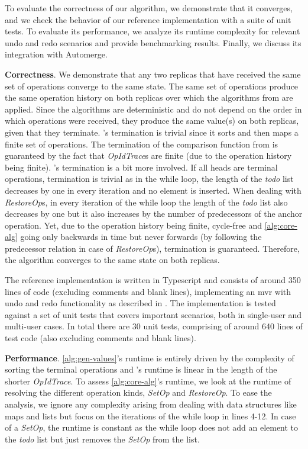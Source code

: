 \documentclass[sigplan,natbib=false,review]{acmart}
\newcommand{\setopkind}{\textit{SetOp}}
\newcommand{\restopkind}{\textit{RestoreOp}}
\newcommand{\opidtrace}{\textit{OpIdTrace}}
\begin{document}
To evaluate the correctness of our algorithm, we demonstrate that it converges,
and we check the behavior of our reference implementation with a suite of unit tests.
To evaluate its performance, we analyze its runtime complexity for relevant
undo and redo scenarios and provide benchmarking results.
Finally, we discuss its integration with Automerge.

\textbf{Correctness}.
We demonstrate that any two replicas that have received the same set of
operations converge to the same state.
The same set of operations produce the same operation history on both
replicas over which the algorithms from  are applied.
Since the algorithms are deterministic and do not depend on the order in which
operations were received, they produce the same value(s) on both
replicas, given that they terminate.
's termination is trivial since it sorts and then
maps a finite set of operations.
The termination of the comparison function from  is
guaranteed by the fact that \opidtrace{}s are finite
(due to the operation history being finite).
's termination is a bit more involved.
If all heads are terminal operations, termination is trivial as in the 
while loop, the length of the \textit{todo} list decreases by one in every iteration
and no element is inserted.
When dealing with \restopkind{}s, in every iteration of the while loop
the length of the \textit{todo} list also decreases by one but it also 
increases by the number of predecessors of the anchor operation.
Yet, due to the operation history being finite, cycle-free and \autoref{alg:core-alg}
going only backwards in time but never forwards
(by following the predecessor relation in case of \restopkind{}s),
termination is guaranteed.
Therefore, the algorithm converges to the same state on both replicas.

The reference implementation is written in Typescript and consists of around 350
lines of code (excluding comments and blank lines),
implementing an \gls*{mvr} with undo and redo functionality as described
in .
The implementation is tested against a set of unit tests that covers important
scenarios, both in single-user and multi-user cases.
In total there are 30 unit tests,
comprising of around 640 lines of test code (also excluding comments and blank lines).

\textbf{Performance}.
\autoref{alg:gen-values}'s runtime is entirely driven by the
complexity of sorting the terminal operations and 's
runtime is linear in the length of the shorter \opidtrace{}.
To assess \autoref{alg:core-alg}'s runtime,
we look at the runtime of resolving the different operation kinds,
\setopkind{} and \restopkind{}.
To ease the analysis, we ignore any complexity arising from dealing with
data structures like maps and lists but focus on the iterations
of the while loop in lines 4-12.
In case of a \setopkind{}, the runtime is constant as the while loop
does not add an element to the \textit{todo} list but just removes the
\setopkind{} from the list.
\end{document}
